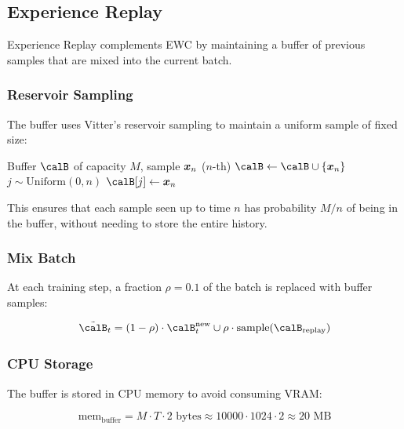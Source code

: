 \subsection{Experience Replay}
\label{sec:replay}

Experience Replay complements EWC by maintaining a buffer of previous
samples that are mixed into the current batch.

\subsubsection{Reservoir Sampling}

The buffer uses Vitter's reservoir sampling \cite{vitter1985reservoir}
to maintain a uniform sample of fixed size:

\begin{algorithm}[H]
\caption{Reservoir Sampling}
\begin{algorithmic}[1]
\REQUIRE Buffer $\calB$ of capacity $M$, sample $\bm{x}_n$ ($n$-th)
    \STATE $\calB \leftarrow \calB \cup \{\bx_n\}$
\ELSE
    \STATE $j \sim \text{Uniform}(0, n)$
        \STATE $\calB[j] \leftarrow \bx_n$
    \ENDIF
\ENDIF
\end{algorithmic}
\end{algorithm}

This ensures that each sample seen up to time $n$ has probability
$M/n$ of being in the buffer, without needing to store the entire
history.

\subsubsection{Mix Batch}

At each training step, a fraction $\rho = 0.1$ of the batch is replaced
with buffer samples:

\begin{equation}
    \tilde{\calB}_t = (1 - \rho) \cdot \calB_t^{\text{new}} \cup \rho \cdot \text{sample}(\calB_{\text{replay}})
\end{equation}

\subsubsection{CPU Storage}

The buffer is stored in CPU memory to avoid consuming VRAM:

\begin{equation}
    \text{mem}_{\text{buffer}} = M \cdot T \cdot 2 \text{ bytes} \approx 10000 \cdot 1024 \cdot 2 \approx 20 \text{ MB}
\end{equation}

